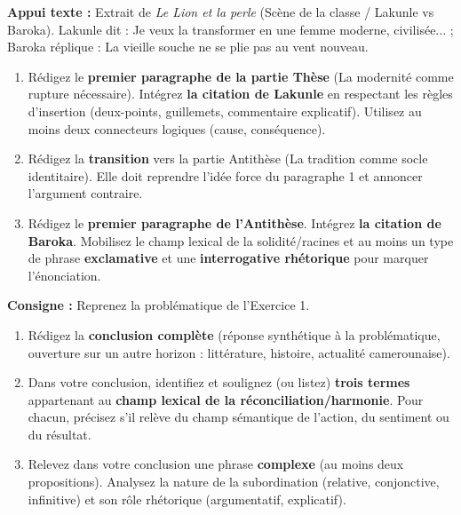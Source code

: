\documentclass[11pt]{article}
\begin{document}
\begin{exercice}
\textbf{Appui texte :} Extrait de \textit{Le Lion et la perle} (Scène de la classe / Lakunle vs Baroka). Lakunle dit : \og Je veux la transformer en une femme moderne, civilisée... \fg{} ; Baroka réplique : \og La vieille souche ne se plie pas au vent nouveau. \fg{}
\begin{enumerate}
    \item Rédigez le \textbf{premier paragraphe de la partie Thèse} (La modernité comme rupture nécessaire). Intégrez \textbf{la citation de Lakunle} en respectant les règles d'insertion (deux-points, guillemets, commentaire explicatif). Utilisez au moins deux connecteurs logiques (cause, conséquence).
    \item Rédigez la \textbf{transition} vers la partie Antithèse (La tradition comme socle identitaire). Elle doit reprendre l'idée force du paragraphe 1 et annoncer l'argument contraire.
    \item Rédigez le \textbf{premier paragraphe de l'Antithèse}. Intégrez \textbf{la citation de Baroka}. Mobilisez le champ lexical de la solidité/racines et au moins un type de phrase \textbf{exclamative} et une \textbf{interrogative rhétorique} pour marquer l'énonciation.
\end{enumerate}
\end{exercice}

\begin{exercice}
\textbf{Consigne :} Reprenez la problématique de l'Exercice 1.
\begin{enumerate}
    \item Rédigez la \textbf{conclusion complète} (réponse synthétique à la problématique, ouverture sur un autre horizon : littérature, histoire, actualité camerounaise).
    \item Dans votre conclusion, identifiez et soulignez (ou listez) \textbf{trois termes} appartenant au \textbf{champ lexical de la réconciliation/harmonie}. Pour chacun, précisez s'il relève du champ sémantique de l'action, du sentiment ou du résultat.
    \item Relevez dans votre conclusion une phrase \textbf{complexe} (au moins deux propositions). Analysez la nature de la subordination (relative, conjonctive, infinitive) et son rôle rhétorique (argumentatif, explicatif).
\end{enumerate}
\end{exercice}
\end{document}
